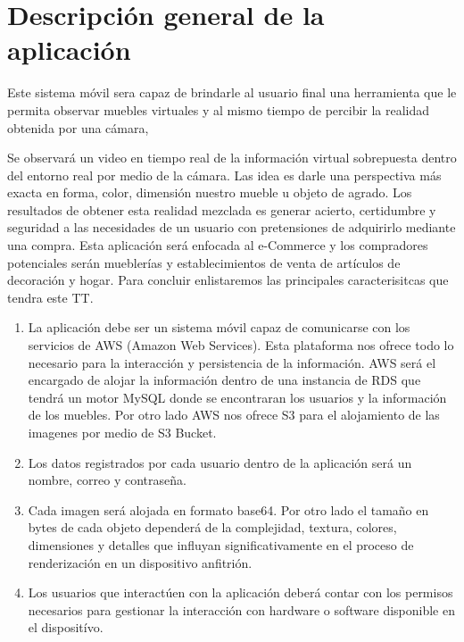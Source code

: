 \section{Descripción general de la aplicación}
Este sistema móvil sera capaz de  brindarle al usuario final una herramienta que le permita observar muebles virtuales y al mismo tiempo de percibir la realidad obtenida por una cámara,\par

Se observará un video en tiempo real de la información virtual sobrepuesta dentro del entorno real por medio de la cámara. Las idea es darle una perspectiva más exacta en forma, color, dimensión nuestro mueble u objeto de agrado. Los resultados de obtener esta realidad mezclada es generar acierto, certidumbre y seguridad a las necesidades de un usuario con pretensiones de adquirirlo mediante una compra. Esta aplicación será enfocada al e-Commerce y los compradores potenciales serán mueblerías y establecimientos de venta de artículos de decoración y hogar. Para concluir enlistaremos las principales caracterisitcas que tendra este TT.\par
\begin{enumerate}[1.]
	\item La aplicación debe ser un sistema móvil capaz de comunicarse con los servicios de AWS (Amazon Web Services). Esta plataforma nos ofrece todo lo necesario para la interacción y persistencia de la información. AWS será el encargado de alojar la información dentro de una instancia de RDS que tendrá un motor MySQL donde se encontraran los usuarios y la información de los muebles. Por otro lado AWS nos ofrece S3 para el alojamiento de las imagenes por medio de S3 Bucket. 
	\item Los datos registrados por cada usuario dentro de la aplicación será un nombre, correo y contraseña.\par
	\item Cada imagen será alojada en formato base64. Por otro lado el tamaño en bytes de cada objeto dependerá de la complejidad, textura, colores, dimensiones y detalles que influyan significativamente en el proceso de renderización en un dispositivo anfitrión.\par
	\item Los usuarios que interactúen con la aplicación deberá contar con los permisos necesarios para gestionar  la interacción con hardware o software disponible en el dispositívo.\par	
\end{enumerate}

